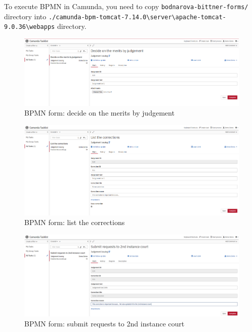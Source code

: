     To execute BPMN in Camunda, you need to copy \verb+bodnarova-bittner-forms/+ directory into \verb+./camunda-bpm-tomcat-7.14.0\server\apache-tomcat-9.0.36\webapps+ directory.
    
    \begin{landscape}
        
        \begin{figure}[h]\centering
            \includegraphics[width=22cm]{pic/camunda1}
            \caption{BPMN form: decide on the merits by judgement}
            \label{fig:camunda1}
        \end{figure}
    
        \begin{figure}[h]\centering
            \includegraphics[width=22cm]{pic/camunda2}
            \caption{BPMN form: list the corrections}
            \label{fig:camunda2}
        \end{figure}
    
        \begin{figure}[h]\centering
            \includegraphics[width=22cm]{pic/camunda3}
            \caption{BPMN form: submit requests to 2nd instance court}
            \label{fig:camunda3}
        \end{figure}
    

\end{landscape}
